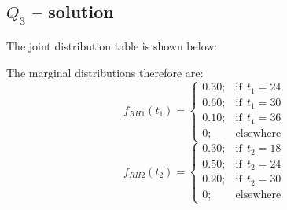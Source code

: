 \documentclass[12pt,a4paper, fleq]{article}
\begin{document}
\subsection*{$Q_{3}$ -- solution}

The joint distribution table is shown below:
\begin{table}[H]
\centering
{}
\end{table}
The marginal distributions therefore are:
\[
f_{RH1}(t_1)=
\begin{cases}
0.30; &\mbox{if}\:\: t_1 = 24\\
0.60; &\mbox{if}\:\: t_1 = 30\\
0.10 ; &\mbox{if}\:\: t_1 = 36\\
0; &\mbox{elsewhere}
\end{cases}
\]
\[
f_{RH2}(t_2)=
\begin{cases}
0.30; &\mbox{if}\:\: t_2 = 18\\
0.50; &\mbox{if}\:\: t_2 = 24\\
0.20 ; &\mbox{if}\:\: t_2 = 30\\
0; &\mbox{elsewhere}
\end{cases}
\]
\end{document}
